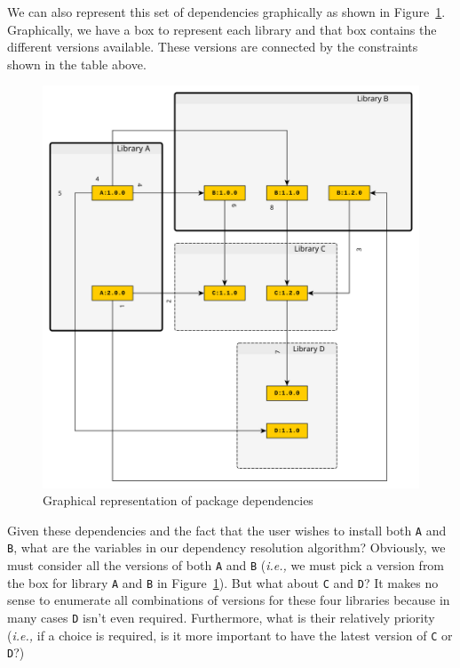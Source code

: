\documentclass[11pt,a4paper,twocolumn]{article}
\newcommand{\code}[1]{\texttt{#1}} %
\begin{document}
We can also represent this set of dependencies graphically as shown in
Figure~\ref{fig:deps}.  Graphically, we have a box to represent each
library and that box contains the different versions available.  These
versions are connected by the constraints shown in the table above.

\begin{figure}[!ht]
  \centering
  \includegraphics[width=\columnwidth]{fig/complex_case}
  \caption{Graphical representation of package dependencies}\label{fig:deps}
\end{figure}

Given these dependencies and the fact that the user wishes to install
both \code{A} and \code{B}, what are the variables in our dependency
resolution algorithm?  Obviously, we must consider all the versions of
both \code{A} and \code{B} (\emph{i.e.,} we must pick a version from
the box for library \code{A} and \code{B} in Figure~\ref{fig:deps}).
But what about \code{C} and \code{D}?  It makes no sense to enumerate
all combinations of versions for these four libraries because in many
cases \code{D} isn't even required.  Furthermore, what is their
relatively priority (\emph{i.e.,} if a choice is required, is it more
important to have the latest version of \code{C} or \code{D}?)
\end{document}
